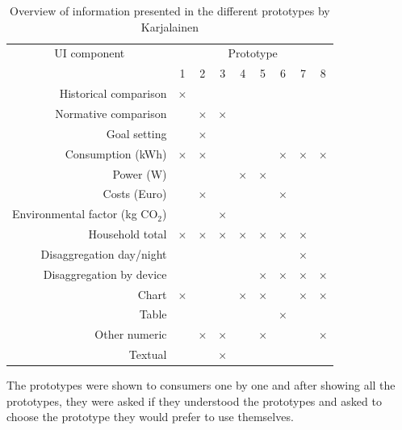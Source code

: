 \documentclass[journal]{vgtc}                %
\begin{document}
\begin{table}[h]
  \caption{Overview of information presented in the different prototypes by Karjalainen \cite{karjalainen2011consumer}}
  \label{prototypes}
  \scriptsize
  \begin{center}
    \begin{tabular}{r|cccccccc}
    
      \multicolumn{1}{c|}{UI component} & \multicolumn{8}{c}{Prototype} \\
    
       & 1 & 2 & 3 & 4 & 5 & 6 & 7 & 8 \\
    \hline
      Historical comparison & $\times$ &  &  &  &  &  &  & \\ \hline
      Normative comparison &  & $\times$ & $\times$ &  &  &  &  & \\ \hline
      Goal setting &  & $\times$ &  &  &  &  &  & \\ \hline
      Consumption (kWh) & $\times$ & $\times$ &  &  &  & $\times$ & $\times$ & $\times$ \\ \hline
      Power (W) &  &  &  & $\times$ & $\times$ &  &  & \\ \hline
      Costs (Euro) &  & $\times$ &  &  &  & $\times$ &  & \\ \hline
      Environmental factor (kg CO$_2$) &  &  & $\times$ &  &  &  &  & \\ \hline
      Household total & $\times$ & $\times$ & $\times$ & $\times$ & $\times$ & $\times$ & $\times$ & \\ \hline
      Disaggregation day/night &  &  &  &  &  &  & $\times$ & \\ \hline
      Disaggregation by device &  &  &  &  & $\times$ & $\times$ & $\times$ & $\times$ \\ \hline
      Chart & $\times$ &  &  & $\times$ & $\times$ &  & $\times$ & $\times$ \\ \hline
      Table &  &  &  &  &  & $\times$ &  & \\ \hline
      Other numeric &  & $\times$ & $\times$ &  & $\times$ &  &  & $\times$ \\ \hline
      Textual &  &  & $\times$ &  &  &  &  & \\ 
    \end{tabular}
  \end{center}
\end{table}

The prototypes were shown to consumers one by one and after showing all the prototypes, they were asked if they understood the prototypes and asked to choose the prototype they would prefer to use themselves.
\end{document}
